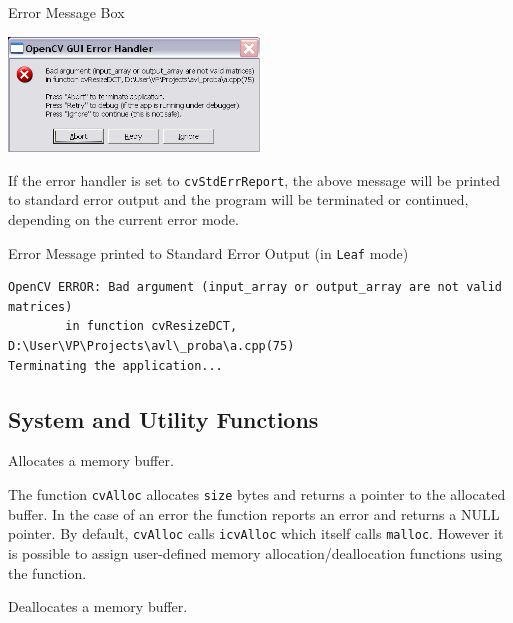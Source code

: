 Error Message Box

\includegraphics[width=0.5\textwidth]{pics/errmsg.png}

If the error handler is set to \texttt{cvStdErrReport}, the above message will be printed to standard error output and the program will be terminated or continued, depending on the current error mode.

Error Message printed to Standard Error Output (in \texttt{Leaf} mode)

\begin{verbatim}
OpenCV ERROR: Bad argument (input_array or output_array are not valid matrices)
        in function cvResizeDCT, D:\User\VP\Projects\avl\_proba\a.cpp(75)
Terminating the application...
\end{verbatim}

\fi

\ifC
\subsection{System and Utility Functions}

\label{Alloc}

Allocates a memory buffer.


\begin{description}
\end{description}

The function \texttt{cvAlloc} allocates \texttt{size} bytes and returns
a pointer to the allocated buffer. In the case of an error the function reports an
error and returns a NULL pointer. By default, \texttt{cvAlloc} calls
\texttt{icvAlloc} which
itself calls \texttt{malloc}. However it is possible to assign user-defined memory
allocation/deallocation functions using the  function.

\label{Free}

Deallocates a memory buffer.


